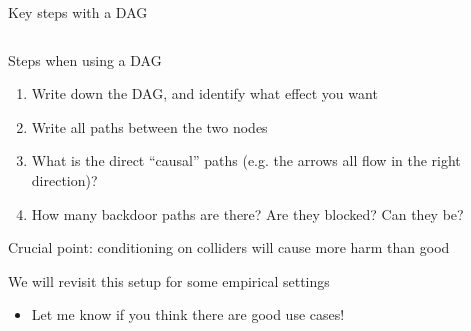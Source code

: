 \documentclass[notes,11pt, aspectratio=169]{beamer}
\newenvironment{wideitemize}{\itemize\addtolength{\itemsep}{10pt}}{\enditemize}
\begin{document}
\begin{frame}{Key steps with a DAG}
\begin{columns}[T] %
  \begin{column}{.7\textwidth}
    \begin{wideitemize}
    \item Steps when using a DAG
      \begin{enumerate}
      \item Write down the DAG, and identify what effect you want
      \item Write all paths between the two nodes
      \item What is the direct ``causal'' paths (e.g. the arrows all flow in the right direction)?
      \item How many backdoor paths are there? Are they blocked? Can they be?
      \end{enumerate}
    \item Crucial point: conditioning on colliders will cause more harm than good
    \item We will revisit this setup for some empirical settings
      \begin{itemize}
      \item Let me know if you think there are good use cases!
      \end{itemize}
    \end{wideitemize}
  \end{column}%
  \hfill%
  \begin{column}{.5\textwidth}
  \end{column}
\end{columns}
\end{frame}
\end{document}
